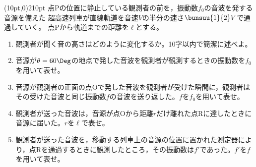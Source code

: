 \hakosyokika
\item
    \begin{mawarikomi}(10pt,0){210pt}{}
        点Pの位置に静止している観測者の前を，振動数$f_0$の音波を発する音源を備えた
        超高速列車が直線軌道を音速$V$の半分の速さ$\bunsuu{1}{2}V$で通過していく。
        点Pから軌道までの距離を$\ell $とする。
        \begin{enumerate}
            \item 観測者が聞く音の高さはどのように変化するか。10字以内で簡潔に述べよ。
            \item 音源が$\theta =60\Deg $の地点で発した音波を観測者が観測するときの振動数を$f_0$を用いて表せ。
            \item 音源が観測者の正面の点Oで発した音波を観測者が受けた瞬間に，観測者はその受けた音波と同じ振動数$f$の音波を送り返した。$f$を$f_0$を用いて表せ。
            \item 観測者が送った音波は，音源が点Oから距離$r$だけ離れた点Rに達したときに音源に届いた。$r$を$\ell $で表せ。
            \item 観測者が送った音波を，移動する列車上の音源の位置に置かれた測定器により，点Rを通過するときに観測したところ，その振動数は$f'$であった。$f'$を$f$を用いて表せ。
        \end{enumerate}
    \end{mawarikomi}